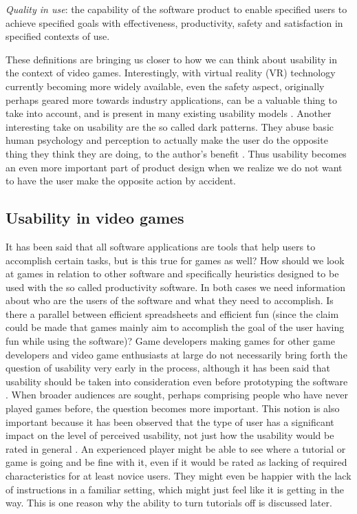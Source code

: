 \begin{displayquote}
	
	\textit{Quality in use}: the capability of the software product to enable specified users to achieve specified goals with effectiveness, productivity, safety and satisfaction in specified contexts of use.
	
\end{displayquote}

These definitions are bringing us closer to how we can think about usability in the context of video games. Interestingly, with virtual reality (VR) technology currently becoming more widely available, even the safety aspect, originally perhaps geared more towards industry applications, can be a valuable thing to take into account, and is present in many existing usability models \cite{Dubey2012}. Another interesting take on usability are the so called dark patterns. They abuse basic human psychology and perception to actually make the user do the opposite thing they think they are doing, to the author's benefit \cite{Brignull2013}. Thus usability becomes an even more important part of product design when we realize we do not want to have the user make the opposite action by accident.

\subsection{Usability in video games}

It has been said that all software applications are tools that help users to accomplish certain tasks, but is this true for games as well? How should we look at games in relation to other software and specifically heuristics designed to be used with the so called productivity software. In both cases we need information about who are the users of the software and what they need to accomplish. \cite{Ferre2001} Is there a parallel between efficient spreadsheets and efficient fun (since the claim could be made that games mainly aim to accomplish the goal of the user having fun while using the software)? Game developers making games for other game developers and video game enthusiasts at large do not necessarily bring forth the question of usability very early in the process, although it has been said that usability should be taken into consideration even before prototyping the software \cite{Holzinger2005}. When broader audiences are sought, perhaps comprising people who have never played games before, the question becomes more important. \cite{Isbister2008} This notion is also important because it has been observed that the type of user has a significant impact on the level of perceived usability, not just how the usability would be rated in general \cite{Cavallin2007}. An experienced player might be able to see where a tutorial or game is going and be fine with it, even if it would be rated as lacking of required characteristics for at least novice users. They might even be happier with the lack of instructions in a familiar setting, which might just feel like it is getting in the way. This is one reason why the ability to turn tutorials off is discussed later.

